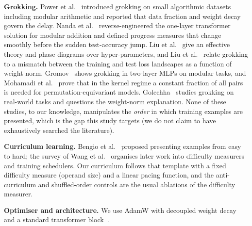 \textbf{Grokking.} Power et al.~\cite{power2022grokking} introduced grokking on small algorithmic datasets including modular arithmetic and reported that data fraction and weight decay govern the delay. Nanda et al.~\cite{nanda2023progress} reverse-engineered the one-layer transformer solution for modular addition and defined progress measures that change smoothly before the sudden test-accuracy jump. Liu et al.~\cite{liu2022understanding} give an effective theory and phase diagrams over hyper-parameters, and Liu et al.~\cite{liu2022omnigrok} relate grokking to a mismatch between the training and test loss landscapes as a function of weight norm. Gromov~\cite{gromov2023grokking} shows grokking in two-layer MLPs on modular tasks, and Mohamadi et al.~\cite{mohamadi2024why} prove that in the kernel regime a constant fraction of all pairs is needed for permutation-equivariant models. Golechha~\cite{golechha2024progress} studies grokking on real-world tasks and questions the weight-norm explanation. None of these studies, to our knowledge, manipulates the \emph{order} in which training examples are presented, which is the gap this study targets (we do not claim to have exhaustively searched the literature).

\textbf{Curriculum learning.} Bengio et al.~\cite{bengio2009curriculum} proposed presenting examples from easy to hard; the survey of Wang et al.~\cite{wang2020survey} organises later work into difficulty measurers and training schedulers. Our curriculum follows that template with a fixed difficulty measure (operand size) and a linear pacing function, and the anti-curriculum and shuffled-order controls are the usual ablations of the difficulty measurer.

\textbf{Optimiser and architecture.} We use AdamW with decoupled weight decay~\cite{loshchilov2017decoupled} and a standard transformer block~\cite{vaswani2017attention}.
